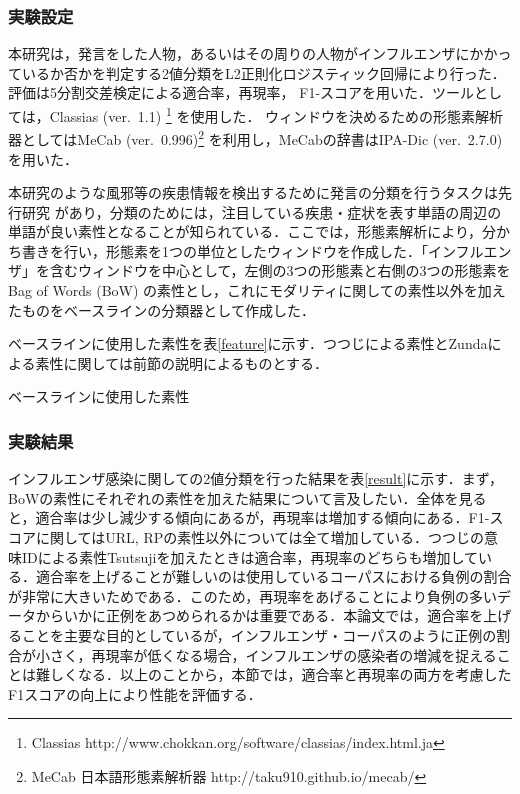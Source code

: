 \documentclass[japanese]{jnlp_1.4}
\begin{document}
 \subsubsection{実験設定}

本研究は，発言をした人物，あるいはその周りの人物がインフルエンザにかかっているか否かを判定する2値分類をL2正則化ロジスティック回帰により行った．評価は5分割交差検定による適合率，再現率， F1-スコアを用いた．ツールとしては，Classias (ver.~1.1) \footnote{Classias http://www.chokkan.org/software/classias/index.html.ja} を使用した．
ウィンドウを決めるための形態素解析器としてはMeCab (ver.~0.996)\footnote{MeCab 日本語形態素解析器 http://taku910.github.io/mecab/} を利用し，MeCabの辞書はIPA-Dic (ver.~2.7.0) を用いた．


本研究のような風邪等の疾患情報を検出するために発言の分類を行うタスクは先行研究
\linebreak
\cite{aramaki-maskawa-morita:2011:EMNLP}があり，分類のためには，注目している疾患・症状を表す単語の周辺の単語が良い素性となることが知られている．ここでは，形態素解析により，分かち書きを行い，形態素を1つの単位としたウィンドウを作成した．「インフルエンザ」を含むウィンドウを中心として，左側の3つの形態素と右側の3つの形態素をBag of Words (BoW) の素性とし，これにモダリティに関しての素性以外を加えたものをベースラインの分類器として作成した．

ベースラインに使用した素性を表\ref{feature}に示す．つつじによる素性とZundaによる素性に関しては前節の説明によるものとする．

\begin{table}[b]
\caption{ベースラインに使用した素性}
\label{feature}

\end{table}


\subsubsection{実験結果}

インフルエンザ感染に関しての2値分類を行った結果を表\ref{result}に示す．まず，BoWの素性にそれぞれの素性を加えた結果について言及したい．全体を見ると，適合率は少し減少する傾向にあるが，再現率は増加する傾向にある．F1-スコアに関してはURL, RPの素性以外については全て増加している．つつじの意味IDによる素性Tsutsujiを加えたときは適合率，再現率のどちらも増加している．適合率を上げることが難しいのは使用しているコーパスにおける負例の割合が非常に大きいためである．このため，再現率をあげることにより負例の多いデータからいかに正例をあつめられるかは重要である．本論文では，適合率を上げることを主要な目的としているが，インフルエンザ・コーパスのように正例の割合が小さく，再現率が低くなる場合，インフルエンザの感染者の増減を捉えることは難しくなる．以上のことから，本節では，適合率と再現率の両方を考慮したF1スコアの向上により性能を評価する．
\end{document}
